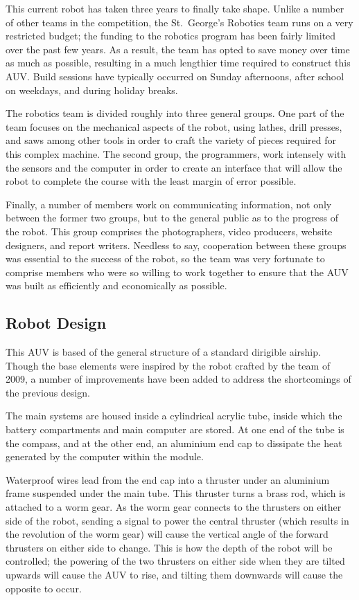 \documentclass[12pt, letterpaper, twocolumn, titlepage]{article}
\begin{document}
This current robot has taken three years to finally take shape. Unlike a number of other teams in the competition, the St.~George's Robotics team runs on a very restricted budget; the funding to the robotics program has been fairly limited over the past few years. As a result, the team has opted to save money over time as much as possible, resulting in a much lengthier time required to construct this AUV. Build sessions have typically occurred on Sunday afternoons, after school on weekdays, and during holiday breaks.

The robotics team is divided roughly into three general groups. One part of the team focuses on the mechanical aspects of the robot, using lathes, drill presses, and saws among other tools in order to craft the variety of pieces required for this complex machine. The second group, the programmers, work intensely with the sensors and the computer in order to create an interface that will allow the robot to complete the course with the least margin of error possible.

Finally, a number of members work on communicating information, not only between the former two groups, but to the general public as to the progress of the robot. This group comprises the photographers, video producers, website designers, and report writers. Needless to say, cooperation between these groups was essential to the success of the robot, so the team was very fortunate to comprise members who were so willing to work together to ensure that the AUV was built as efficiently and economically as possible.

\subsection{Robot Design}
This AUV is based of the general structure of a standard dirigible airship. Though the base elements were inspired by the robot crafted by the team of 2009, a number of improvements have been added to address the shortcomings of the previous design.

The main systems are housed inside a cylindrical acrylic tube, inside which the battery compartments and main computer are stored. At one end of the tube is the compass, and at the other end, an aluminium end cap to dissipate the heat generated by the computer within the module.

Waterproof wires lead from the end cap into a thruster under an aluminium frame suspended under the main tube. This thruster turns a brass rod, which is attached to a worm gear. As the worm gear connects to the thrusters on either side of the robot, sending a signal to power the central thruster (which results in the revolution of the worm gear) will cause the vertical angle of the forward thrusters on either side to change. This is how the depth of the robot will be controlled; the powering of the two thrusters on either side when they are tilted upwards will cause the AUV to rise, and tilting them downwards will cause the opposite to occur.
\end{document}
